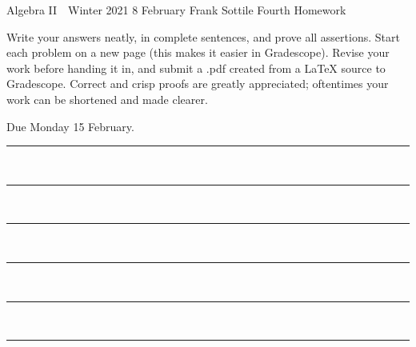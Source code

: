 \documentclass[12pt]{article}
\newcommand{\barsl}{\noindent\begin{minipage}[t]{575pt}
{\color{violet}\rule{575pt}{1.2pt}}\vspace{-5.7mm}\\
{\color{blue}\rule{575pt}{1.2pt}}\vspace{-5.7mm}\\
{\color{green}\rule{575pt}{1.2pt}}\vspace{-5.7mm}\\
{\color{yellow}\rule{575pt}{1.2pt}}\vspace{-5.7mm}\\
{\color{orange}\rule{575pt}{1.2pt}}\vspace{-5.7mm}\\
{\color{red}\rule{575pt}{1.2pt}}
\end{minipage}}
\begin{document}
\LARGE 
\noindent
Algebra II\ \ Winter 2021 \hfill 8 February\makebox[40pt][l]{\ }\newline
Frank Sottile \hfill
\Large\sf
Fourth Homework\makebox[40pt][l]{\ }
\vspace{5pt}
\normalsize

\noindent
Write your answers neatly, in complete sentences, and prove all assertions.
Start each problem on a new page (this makes it easier in Gradescope).
Revise your work before handing it in, and submit a .pdf  created from a LaTeX source to Gradescope.
Correct and crisp proofs are greatly appreciated; oftentimes your work can be shortened and made clearer.

\noindent
{\color{red}Due Monday 15 February.}\vspace{1pt}

\barsl
\end{document}
